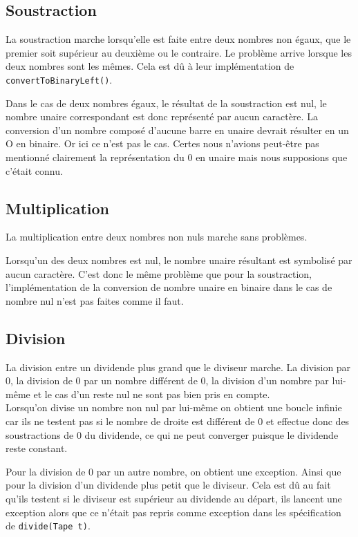 \documentclass[a4paper,11pt]{article}
\begin{document}
    \subsection{Soustraction}

La soustraction marche lorsqu'elle est faite entre deux nombres non égaux, que le premier soit supérieur au deuxième ou le contraire. Le problème arrive lorsque les deux nombres sont les mêmes. Cela est dû à leur implémentation de \texttt{convertToBinaryLeft()}.

Dans le cas de deux nombres égaux, le résultat de la soustraction est nul, le nombre unaire correspondant est donc représenté par aucun caractère. La conversion d'un nombre composé d'aucune barre en unaire devrait résulter en un O en binaire. Or ici ce n'est pas le cas. Certes nous n'avions peut-être pas mentionné clairement la représentation du 0 en unaire mais nous supposions que c'était connu.

    \subsection{Multiplication}

La multiplication entre deux nombres non nuls marche sans problèmes.

Lorsqu'un des deux nombres est nul, le nombre unaire résultant est symbolisé par aucun caractère. C'est donc le même problème que pour la soustraction, l'implémentation de la conversion de nombre unaire en binaire dans le cas de nombre nul n'est pas faites comme il faut.

    \subsection{Division}

La division entre un dividende plus grand que le diviseur marche. La division par 0, la division de 0 par un nombre différent de 0, la division d'un nombre par lui-même et le cas d'un reste nul ne sont pas bien pris en compte. \\

Lorsqu'on divise un nombre non nul par lui-même on obtient une boucle infinie car ils ne testent pas si le nombre de droite est différent de 0 et effectue donc des soustractions de 0 du dividende, ce qui ne peut converger puisque le dividende reste constant.

Pour la division de 0 par un autre nombre, on obtient une exception. Ainsi que pour la division d'un dividende plus petit que le diviseur. Cela est dû au fait qu'ils testent si le diviseur est supérieur au dividende au départ, ils lancent une exception alors que ce n'était pas repris comme exception dans les spécification de \texttt{divide(Tape t)}.
\end{document}
